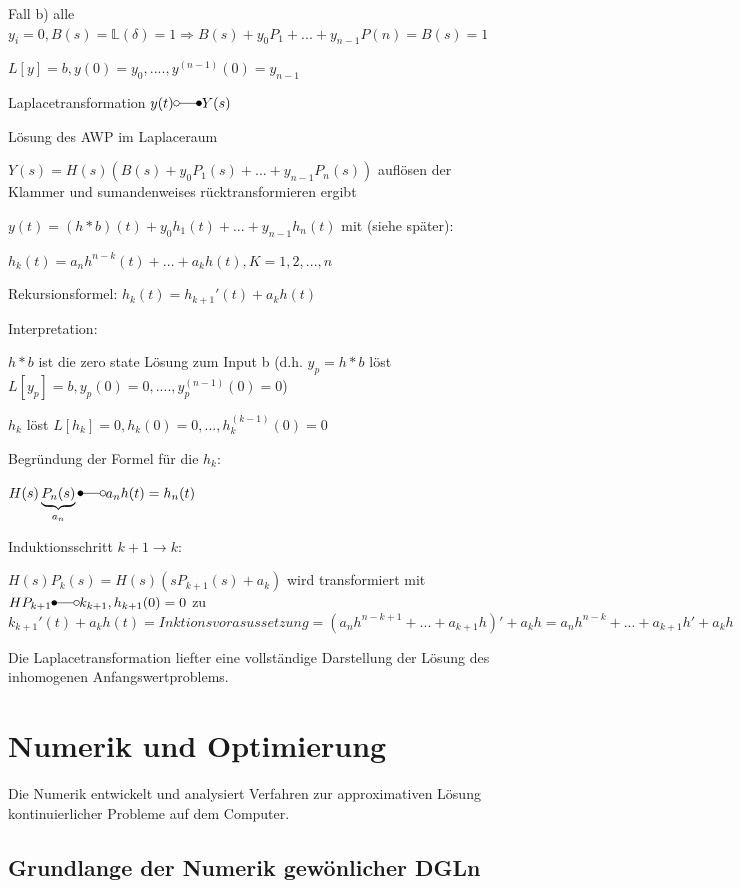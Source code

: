 \documentclass[10pt,a4paper]{article}
\begin{document}
Fall b) alle $y_i=0, B(s)=\mathbb{L}(\delta)=1 \Rightarrow B(s)+y_0 P_1 +...+y_{n-1}P(n)=B(s)=1$







$L[y]=b, y(0)=y_0, ...., y^{(n-1)}(0)=y_{n-1}$

Laplacetransformation $y(t) \laplace Y(s)$

Lösung des AWP im Laplaceraum

$Y(s)=H(s)(B(s)+y_0P_1(s)+...+ y_{n-1}P_n(s))$ auflösen der Klammer und sumandenweises rücktransformieren ergibt

$y(t) = (h * b)(t) + y_0 h_1(t) + ... + y_{n-1}h_n(t)$ mit (siehe später):

$h_k(t)=a_n h^{n-k}(t) + ... + a_kh(t), K=1,2,...,n$

Rekursionsformel:
$h_k(t)=h_{k+1}'(t)+a_k h(t)$

Interpretation: 

$h * b$ ist die zero state Lösung zum Input b (d.h. $y_p=h * b$ löst $L[y_p]=b,y_p(0)=0,....,y_p^{(n-1)}(0)=0$)

$h_k$ löst $L[h_k]=0, h_k(0)=0,...,h_k^{(k-1)}(0)=0$

Begründung der Formel für die $h_k$:

$H(s)\underbrace{P_n(s)}_{a_n} \Laplace a_n h(t)=h_n(t)$

Induktionsschritt $k+1 \rightarrow k$:

$H(s)P_k(s)=H(s)(sP_{k+1}(s)+a_k)$ wird transformiert mit $HP_{k+1} \Laplace k_{k+1}, h_{k+1}(0)=0$ zu $k_{k+1}'(t)+a_k h(t) = Inktionsvorasussetzung = (a_n h^{n-k+1}+...+a_{k+1}h)'+a_k h = a_n h^{n-k}+...+a_{k+1}h'+a_kh$

Die Laplacetransformation liefter eine vollständige Darstellung der Lösung des inhomogenen Anfangswertproblems.


\section{Numerik und Optimierung}

Die Numerik entwickelt und analysiert Verfahren zur approximativen Lösung kontinuierlicher Probleme auf dem Computer.

\subsection{Grundlange der Numerik gewönlicher DGLn} 
\end{document}
